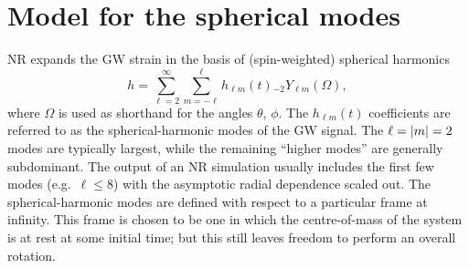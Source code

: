 \section{Model for the spherical modes}
\label{ch2:sec:model}

NR expands the GW strain in the basis of (spin-weighted) spherical harmonics
\begin{equation}\label{ch2:eq:spherical_expansion}
    h = \sum_{\ell = 2}^\infty \sum_{m = -\ell}^\ell h_{\ell m}(t) {}_{-2}Y_{\ell m}(\Omega),
\end{equation}
where $\Omega$ is used as shorthand for the angles $\theta$, $\phi$.
The $h_{\ell m}(t)$ coefficients are referred to as the spherical-harmonic modes of the GW signal.
The $\ell=\abs{m}=2$ modes are typically largest, while the remaining ``higher modes'' are generally subdominant.
The output of an NR simulation usually includes the first few modes (e.g.\ $\ell \leq 8$) with the asymptotic radial dependence scaled out.
The spherical-harmonic modes are defined with respect to a particular frame at infinity.
This frame is chosen to be one in which the centre-of-mass of the system is at rest at some initial time; but this still leaves freedom to perform an overall rotation.

